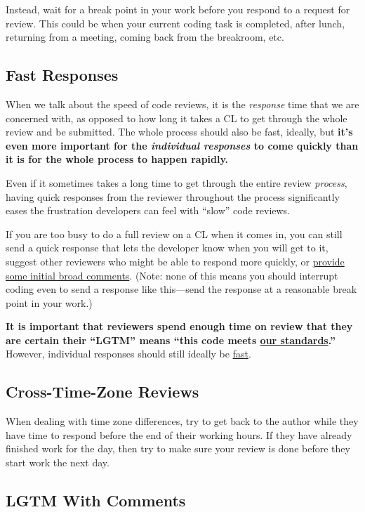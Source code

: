 \documentclass[
]{article}
\begin{document}
Instead, wait for a break point in your work before you respond to a
request for review. This could be when your current coding task is
completed, after lunch, returning from a meeting, coming back from the
breakroom, etc.

\subsection{Fast Responses}\label{responses}

When we talk about the speed of code reviews, it is the \emph{response}
time that we are concerned with, as opposed to how long it takes a CL to
get through the whole review and be submitted. The whole process should
also be fast, ideally, but \textbf{it's even more important for the
\emph{individual responses} to come quickly than it is for the whole
process to happen rapidly.}

Even if it sometimes takes a long time to get through the entire review
\emph{process}, having quick responses from the reviewer throughout the
process significantly eases the frustration developers can feel with
``slow'' code reviews.

If you are too busy to do a full review on a CL when it comes in, you
can still send a quick response that lets the developer know when you
will get to it, suggest other reviewers who might be able to respond
more quickly, or \href{navigate.md}{provide some initial broad
comments}. (Note: none of this means you should interrupt coding even to
send a response like this---send the response at a reasonable break
point in your work.)

\textbf{It is important that reviewers spend enough time on review that
they are certain their ``LGTM'' means ``this code meets
\href{standard.md}{our standards}.''} However, individual responses
should still ideally be \hyperref[fast]{fast}.

\subsection{Cross-Time-Zone Reviews}\label{tz}

When dealing with time zone differences, try to get back to the author
while they have time to respond before the end of their working hours.
If they have already finished work for the day, then try to make sure
your review is done before they start work the next day.

\subsection{LGTM With Comments}\label{lgtm-with-comments}
\end{document}

